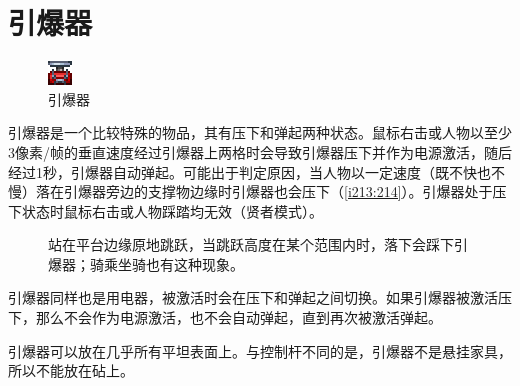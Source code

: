 \section{引爆器}
\begin{figure}[!ht]
\centering
\includegraphics{figures/Detonator.png}
\caption{引爆器}
\end{figure}
引爆器是一个比较特殊的物品，其有压下和弹起两种状态。鼠标右击或人物以至少3像素/帧的垂直速度经过引爆器上两格时会导致引爆器压下并作为电源激活，随后经过1秒，引爆器自动弹起。可能出于判定原因，当人物以一定速度（既不快也不慢）落在引爆器旁边的支撑物边缘时引爆器也会压下（\autoref{i213:214}）。引爆器处于压下状态时鼠标右击或人物踩踏均无效（贤者模式）。

\begin{figure}[!ht]
\begin{center}
\qquad
{}
\end{center}
\caption{\protect{}站在平台边缘原地跳跃，当跳跃高度在某个范围内时，落下会踩下引爆器；\protect{}骑乘坐骑也有这种现象。}
\label{i213:214}
\end{figure}

引爆器同样也是用电器，被激活时会在压下和弹起之间切换。如果引爆器被激活压下，那么不会作为电源激活，也不会自动弹起，直到再次被激活弹起。

引爆器可以放在几乎所有平坦表面上。与控制杆不同的是，引爆器不是悬挂家具，所以不能放在砧上。

